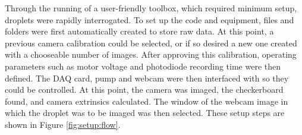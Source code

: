 \documentclass{physics_article_B}
\begin{document}
        Through the running of a user-friendly toolbox, which required minimum setup, droplets were rapidly interrogated. To set up the code and equipment, files and folders were first automatically created to store raw data. At this point, a previous camera calibration could be selected, or if so desired a new one created with a chooseable number of images. After approving this calibration, operating parameters such as motor voltage and photodiode recording time were then defined. The DAQ card, pump and webcam were then interfaced with so they could be controlled. At this point, the camera was imaged, the checkerboard found, and camera extrinsics calculated. The window of the webcam image in which the droplet was to be imaged was then selected. These setup steps are shown in Figure \ref{fig:setup:flow}.
        
        \newpage
\end{document}
